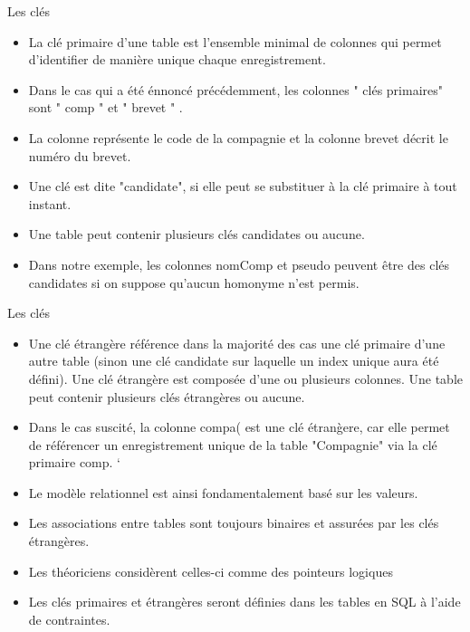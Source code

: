 \documentclass{beamer}
\begin{document}
\begin{frame}{Les cl\'es}
\begin{itemize}
\item La cl\'e primaire d'une table est l'ensemble minimal de colonnes qui permet d'identifier de mani\`ere unique chaque enregistrement.
\item Dans le cas qui a \'et\'e \'ennonc\'e pr\'ec\'edemment, les colonnes " cl\'es primaires" sont " comp " et " brevet " .
\item La colonne repr\'esente le code de la compagnie et la colonne brevet d\'ecrit le num\'ero du brevet.
\item Une cl\'e est dite "candidate", si elle peut se substituer \`a la cl\'e primaire \`a tout instant.
\item Une table peut contenir plusieurs cl\'es candidates ou aucune.
\item Dans notre exemple, les colonnes nomComp et pseudo peuvent \^etre des cl\'es candidates si on suppose qu'aucun homonyme n'est permis.
\end{itemize}
\end{frame}  
\begin{frame}{ Les cl\'es}
\begin{itemize}
    \item Une cl\'e \'etrang\`ere r\'ef\'erence dans la majorit\'e des cas une cl\'e primaire d'une autre table (sinon une cl\'e candidate sur laquelle un index unique aura \'et\'e d\'efini). Une cl\'e \'etrang\`ere est compos\'ee d'une ou plusieurs colonnes. Une table peut contenir plusieurs cl\'es \'etrang\`eres ou aucune.
    \item Dans le cas suscit\'e, la colonne compa( est une cl\'e \'etran\`gere, car elle permet de r\'ef\'erencer un enregistrement unique de la table "Compagnie" via la cl\'e primaire comp.
    `\item Le mod\`ele relationnel est ainsi fondamentalement bas\'e sur les valeurs.
    \item Les associations entre tables sont toujours binaires et assur\'ees par les cl\'es \'etrang\`eres.
    \item Les th\'eoriciens consid\`erent celles-ci comme des pointeurs logiques
    \item Les cl\'es primaires et \'etrang\`eres seront d\'efinies dans les tables en SQL \`a l'aide de contraintes.
 \end{itemize}
\end{frame}
\end{document}
